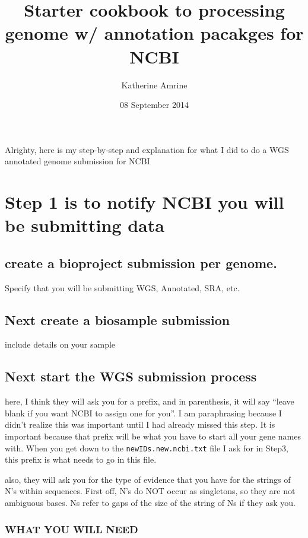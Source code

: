 \documentclass[11pt]{article}
\title{Starter cookbook to processing genome w/ annotation pacakges for NCBI}
\author{Katherine Amrine}
\date{08 September 2014}
\begin{document}
\maketitle


 Alrighty, here is my step-by-step and explanation for what I did to
 do a WGS annotated genome submission for NCBI

\section*{Step 1 is to notify NCBI you will be submitting data}
\label{sec-1}


\subsection*{create a bioproject submission per genome.}
\label{sec-1.1}

Specify that you will be submitting WGS, Annotated, SRA, etc. 

\subsection*{Next create a biosample submission}
\label{sec-1.2}

   include details on your sample
   
\subsection*{Next start the WGS submission process}
\label{sec-1.3}

   here, I think they will ask you for a prefix, and in parenthesis, it will say
   ``leave blank if you want NCBI to assign one for you''. I am paraphrasing because
   I didn't realize this was important until I had already missed this step. 
   It is important because that prefix will be what you have to start all your gene
   names with. When you get down to the \texttt{newIDs.new.ncbi.txt} file I ask for in Step3,
   this prefix is what needs to go in this file. 

   also, they will ask you for the type of evidence that you have for the strings of 
   N's within sequences. First off, N's do NOT occur as singletons, so they are not 
   ambiguous bases. Ns refer to gaps of the size of the string of Ns if they ask you. 
\subsubsection*{WHAT YOU WILL NEED}
\label{sec-1.3.1}
\end{document}
